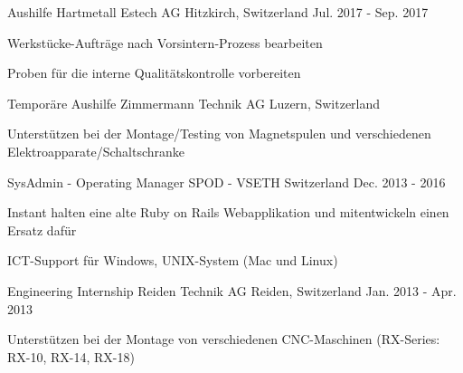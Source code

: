 \begin{cventries}
\cventry
	{Aushilfe} %
	{Hartmetall Estech AG} %
	{Hitzkirch, Switzerland} %
	{Jul. 2017 - Sep. 2017} %
	{
		\begin{cvitems} %
			\item {Werkstücke-Aufträge nach Vorsintern-Prozess bearbeiten}
			\item {Proben für die interne Qualitätskontrolle vorbereiten}
		\end{cvitems}
}

\cventry
	{Temporäre Aushilfe} %
	{Zimmermann Technik AG} %
	{Luzern, Switzerland} %
	{} %
	{
		\begin{cvitems} %
			\item {Unterstützen bei der Montage/Testing von Magnetspulen und verschiedenen Elektroapparate/Schaltschranke}
		\end{cvitems}
	}	

  \cventry
    {SysAdmin - Operating Manager} %
    {SPOD - VSETH} %
    {Switzerland} %
    {Dec. 2013 - 2016} %
    {
      \begin{cvitems} %
        \item {Instant halten eine alte Ruby on Rails Webapplikation und mitentwickeln einen Ersatz dafür}
        \item {ICT-Support für Windows, UNIX-System (Mac und Linux)}
      \end{cvitems}
    }

  \cventry
    {Engineering Internship} %
    {Reiden Technik AG} %
    {Reiden, Switzerland} %
    {Jan. 2013 - Apr. 2013} %
    {
      \begin{cvitems} %
        \item {Unterstützen bei der Montage von verschiedenen CNC-Maschinen (RX-Series: RX-10, RX-14, RX-18)}
      \end{cvitems}
    }


\end{cventries}
